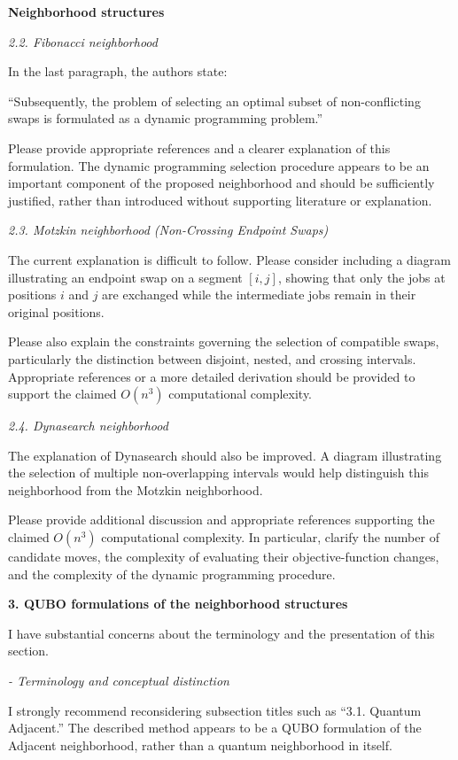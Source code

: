 \documentclass[12pt]{article}
\begin{document}
\textbf{Neighborhood structures}

\emph{2.2. Fibonacci neighborhood}

In the last paragraph, the authors state:

``Subsequently, the problem of selecting an optimal subset of non-conflicting swaps is formulated as a dynamic programming problem.''

Please provide appropriate references and a clearer explanation of this formulation. The dynamic programming selection procedure appears to be an important component of the proposed neighborhood and should be sufficiently justified, rather than introduced without supporting literature or explanation.

\emph{2.3. Motzkin neighborhood (Non-Crossing Endpoint Swaps)}

The current explanation is difficult to follow. Please consider including a diagram illustrating an endpoint swap on a segment $[i,j]$, showing that only the jobs at positions $i$ and $j$ are exchanged while the intermediate jobs remain in their original positions.

Please also explain the constraints governing the selection of compatible swaps, particularly the distinction between disjoint, nested, and crossing intervals. Appropriate references or a more detailed derivation should be provided to support the claimed $O(n^3)$ computational complexity.

\emph{2.4. Dynasearch neighborhood}

The explanation of Dynasearch should also be improved. A diagram illustrating the selection of multiple non-overlapping intervals would help distinguish this neighborhood from the Motzkin neighborhood.

Please provide additional discussion and appropriate references supporting the claimed $O(n^3)$ computational complexity. In particular, clarify the number of candidate moves, the complexity of evaluating their objective-function changes, and the complexity of the dynamic programming procedure.

\textbf{3. QUBO formulations of the neighborhood structures}

I have substantial concerns about the terminology and the presentation of this section.

\emph{- Terminology and conceptual distinction}

I strongly recommend reconsidering subsection titles such as ``3.1. Quantum Adjacent.'' The described method appears to be a QUBO formulation of the Adjacent neighborhood, rather than a quantum neighborhood in itself.
\end{document}
